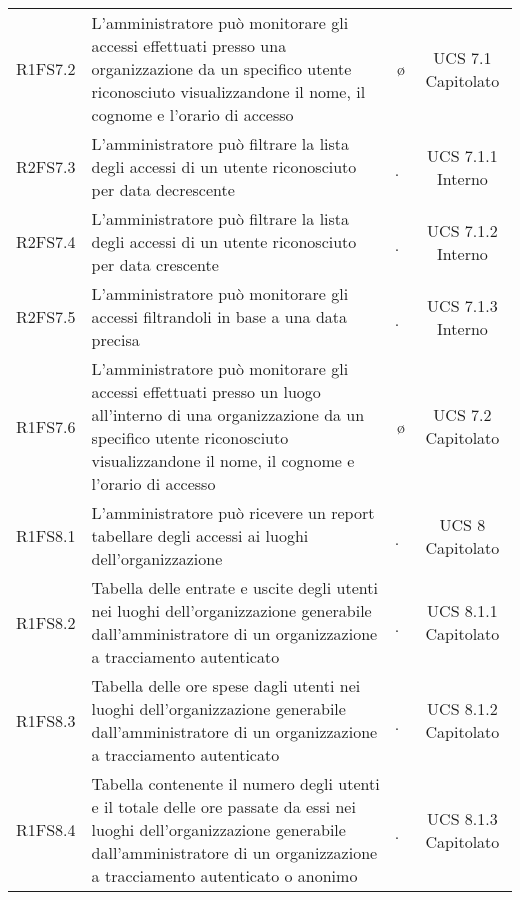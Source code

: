 {\begin{longtable}{ c C{8cm} c c}
R1FS7.2 & L'amministratore può monitorare gli accessi effettuati presso una organizzazione da un specifico utente riconosciuto visualizzandone il nome, il cognome e l'orario di accesso & \o & UCS 7.1 Capitolato\\

R2FS7.3 & L’amministratore può filtrare la lista degli accessi di un utente riconosciuto per data decrescente & \d & UCS 7.1.1 Interno \\

R2FS7.4 & L’amministratore può filtrare la lista degli accessi di un utente riconosciuto per data crescente & \d & UCS 7.1.2 Interno \\

R2FS7.5 & L'amministratore può monitorare gli accessi filtrandoli in base a una data precisa & \d & UCS 7.1.3 Interno\\

R1FS7.6 & L'amministratore può monitorare gli accessi effettuati presso un luogo all'interno di una organizzazione da un specifico utente riconosciuto visualizzandone il nome, il cognome e l'orario di accesso & \o & UCS 7.2 Capitolato\\

R1FS8.1 & L'amministratore può ricevere un report tabellare degli accessi ai luoghi dell'organizzazione & \d & UCS 8 Capitolato\\

R1FS8.2 &  Tabella delle entrate e uscite degli utenti nei luoghi dell'organizzazione generabile dall'amministratore di un organizzazione a tracciamento autenticato & \d & UCS 8.1.1 Capitolato\\

R1FS8.3 & Tabella delle ore spese dagli utenti nei luoghi dell'organizzazione generabile dall'amministratore di un organizzazione a tracciamento autenticato & \d & UCS 8.1.2 Capitolato\\

R1FS8.4 & Tabella contenente il numero degli utenti e il totale delle ore passate da essi nei luoghi dell'organizzazione generabile dall'amministratore di un organizzazione a tracciamento autenticato o anonimo & \d & UCS 8.1.3 Capitolato\\





\end{longtable}}
